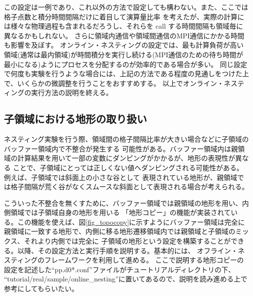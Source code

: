 この設定は一例であり、これ以外の方法で設定しても構わない。また、ここでは格子点数と積分時間間隔だけに着目して演算量比率
を考えたが、実際の計算には様々な物理過程も含まれるだろうし、それらを call する時間間隔も領域毎に異なるかもしれない。
さらに領域内通信や領域間通信のMPI通信にかかる時間も影響を及ぼす。
オンライン・ネスティングの設定では、最も計算負荷が高い領域(通常は最内領域)が時間積分を実行し続ける(MPI通信のための待ち時間が最小になる)ようにプロセスを分配するのが効率的である場合が多い。
同じ設定で何度も実験を行うような場合には、上記の方法である程度の見通しをつけた上で、いくらかの微調整を行うことをおすすめする。
以上でオンライン・ネスティングの実行方法の説明を終える。


\subsection{子領域における地形の取り扱い} \label{sec:nest_topo}
ネスティング実験を行う際、領域間の格子間隔比率が大きい場合などに子領域のバッファー領域内で不整合が発生する
可能性がある。バッファー領域内は親領域の計算結果を用いて一部の変数にダンピングがかかるが、地形の表現性が異なる
ことで、子領域にとっては正しくない値へダンピングされる可能性がある。例えば、子領域では斜面上の小さな谷として
表現されている地形が、親領域では格子間隔が荒く谷がなくスムースな斜面として表現される場合が考えられる。

こういった不整合を無くすために、バッファー領域では親領域の地形を用い、内側領域では子領域自身の地形を用いる
「地形コピー」の機能が実装されている。この機能を使えば、図\ref{fig_topocopy}に示すようにバッファー領域は完全に
親領域に一致する地形で、内側に移る地形遷移領域内では親領域と子領域のミックス、それより内側では完全に
子領域の地形という設定を構築することができる。以降、その設定方法と実行手順を説明する。基本的には、
オフライン・ネスティングのフレームワークを利用して進める。
ここで説明する地形コピーの設定を記述した``pp.d0*.conf''ファイルがチュートリアルディレクトリの下、
``tutorial/real/sample/online\_nesting''に置いてあるので、説明を読み進める上で参考にしてもらいたい。


